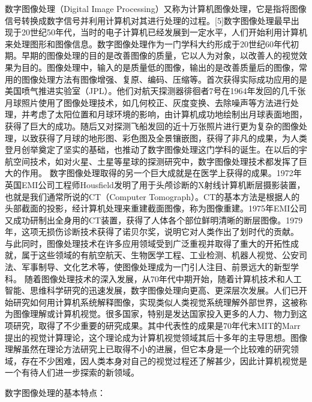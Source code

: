 \documentclass[18pt, twoside, a4paper, dvipdfm]{book}
\begin{document}
	数字图像处理（Digital Image Processing）又称为计算机图像处理，它是指将图像信号转换成数字信号并利用计算机对其进行处理的过程。[5]数字图像处理最早出现于20世纪50年代，当时的电子计算机已经发展到一定水平，人们开始利用计算机来处理图形和图像信息。数字图像处理作为一门学科大约形成于20世纪60年代初期。早期的图像处理的目的是改善图像的质量，它以人为对象，以改善人的视觉效果为目的。图像处理中，输入的是质量低的图像，输出的是改善质量后的图像，常用的图像处理方法有图像增强、复原、编码、压缩等。首次获得实际成功应用的是美国喷气推进实验室（JPL）。他们对航天探测器徘徊者7号在1964年发回的几千张月球照片使用了图像处理技术，如几何校正、灰度变换、去除噪声等方法进行处理，并考虑了太阳位置和月球环境的影响，由计算机成功地绘制出月球表面地图，获得了巨大的成功。随后又对探测飞船发回的近十万张照片进行更为复杂的图像处理，以致获得了月球的地形图、彩色图及全景镶嵌图，获得了非凡的成果，为人类登月创举奠定了坚实的基础，也推动了数字图像处理这门学科的诞生。在以后的宇航空间技术，如对火星、土星等星球的探测研究中，数字图像处理技术都发挥了巨大的作用。 数字图像处理取得的另一个巨大成就是在医学上获得的成果。1972年英国EMI公司工程师Housfield发明了用于头颅诊断的X射线计算机断层摄影装置，也就是我们通常所说的CT（Computer Tomograph）。CT的基本方法是根据人的头部截面的投影，经计算机处理来重建截面图像，称为图像重建。1975年EMI公司又成功研制出全身用的CT装置，获得了人体各个部位鲜明清晰的断层图像。1979年，这项无损伤诊断技术获得了诺贝尔奖，说明它对人类作出了划时代的贡献。 与此同时，图像处理技术在许多应用领域受到广泛重视并取得了重大的开拓性成就，属于这些领域的有航空航天、生物医学工程、工业检测、机器人视觉、公安司法、军事制导、文化艺术等，使图像处理成为一门引人注目、前景远大的新型学科。 随着图像处理技术的深入发展，从70年代中期开始，随着计算机技术和人工智能、思维科学研究的迅速发展，数字图像处理向更高、更深层次发展。人们已开始研究如何用计算机系统解释图像，实现类似人类视觉系统理解外部世界，这被称为图像理解或计算机视觉。很多国家，特别是发达国家投入更多的人力、物力到这项研究，取得了不少重要的研究成果。其中代表性的成果是70年代末MIT的Marr提出的视觉计算理论，这个理论成为计算机视觉领域其后十多年的主导思想。图像理解虽然在理论方法研究上已取得不小的进展，但它本身是一个比较难的研究领域，存在不少困难，因人类本身对自己的视觉过程还了解甚少，因此计算机视觉是一个有待人们进一步探索的新领域。

数字图像处理的基本特点：
\end{document}
